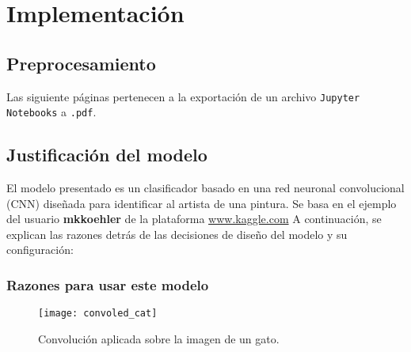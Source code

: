 \documentclass[../main.tex]{subfiles}
\begin{document}
\section{Implementación}

\subsection{Preprocesamiento}

Las siguiente páginas pertenecen a la exportación de un archivo \texttt{Jupyter Notebooks} a \texttt{.pdf}.



\subsection{Justificación del modelo}

El modelo presentado es un clasificador basado en una red neuronal convolucional (CNN) diseñada para identificar al artista de una pintura. Se basa en el ejemplo del usuario \textbf{mkkoehler} de la plataforma \url{www.kaggle.com} \cite{Mkkoehler_2020} A continuación, se explican las razones detrás de las decisiones de diseño del modelo y su configuración:

\subsubsection{Razones para usar este modelo}

\begin{figure}[htbp] %
  \centering
  \texttt{[image: convoled\_cat]} %
  \caption{Convolución aplicada sobre la imagen de un gato.}
  \label{fig:convoled_cat} %
\end{figure}
\end{document}
